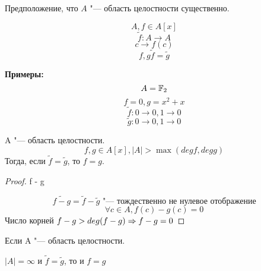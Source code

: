 \begin{Rem}
Предположение, что $A$ "--- область целостности существенно.  
\end{Rem}

\begin{Def}
$$A, f \in A[x]$$
$$\tilde f: A \to A$$
$$c \to f(c)$$
$$f, g \tilde f = \tilde g$$
\end{Def}
{\bf Примеры:}
$$A = \mathbb{F}_2$$
$$f = 0, g = x^2 + x$$
$$ \tilde f: 0 \to 0, 1 \to 0$$
$$ \tilde g: 0 \to 0, 1 \to 0$$

\begin{conseq}
A "--- область целостности.
$$f, g \in A[x], |A| > \max(deg f, deg g)$$
Тогда, если $\tilde f = \tilde g$, то $f = g$.
\end{conseq}
\begin{proof}
f - g

$$\tilde{f - g} = \tilde f - \tilde g \text{ "--- тождественно не нулевое отображение}$$
$$\forall c \in A, f(c) - g(c) = 0$$
Число корней $f - g > deg(f - g) \Rightarrow f - g = 0$
\end{proof}

\begin{conseq}
Если A "--- область целостности.

$|A| = \infty$ и $\tilde f = \tilde g$, то и $f = g$
\end{conseq}